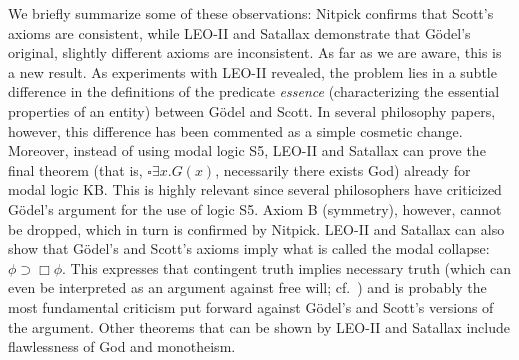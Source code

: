 \documentclass{llncs}
\begin{document}
We briefly summarize some of these observations: Nitpick confirms that
Scott's axioms are consistent, while LEO-II and Satallax demonstrate that
Gödel's original, slightly different axioms are inconsistent. As far
as we are aware, this is a new result. As experiments with LEO-II
revealed, the problem lies in a subtle difference in the definitions
of the predicate \textit{essence} (characterizing the essential
properties of an entity) between Gödel and Scott. In several philosophy papers, however, this
difference has been commented as a simple cosmetic change.  Moreover,
instead of using modal logic S5, 
LEO-II and Satallax can prove the final theorem (that is,
$\square \exists x . G(x)$, necessarily there exists God) already for
modal logic KB.  This is highly relevant since several philosophers
have criticized G{\"o}del's argument for the use of logic S5.  Axiom
B (symmetry), however, cannot be dropped, which in turn is confirmed by Nitpick.
LEO-II and Satallax can also show that G{\"o}del's and Scott's axioms
imply what is called the modal collapse: $\phi\supset\Box\phi$. This
expresses that contingent truth implies necessary truth (which
can even be interpreted as an argument against free will;
cf.~\cite{sobel2004logic}) and is probably the most
fundamental criticism put forward against G{\"o}del's and Scott's
versions of the argument. Other theorems that can be shown by LEO-II
and Satallax include flawlessness of God and monotheism. 
\end{document}
